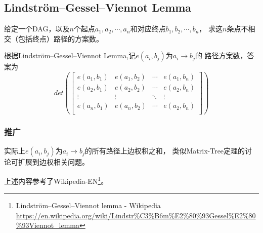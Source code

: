 \subsection{Lindström–Gessel–Viennot Lemma}
给定一个DAG，以及$n$个起点$a_1,a_2,\cdots,a_n$和对应终点$b_1,b_2,\cdots,b_n$，
求这$n$条点不相交（包括终点）路径的方案数。

根据Lindström–Gessel–Viennot Lemma,记$e(a_i,b_j)$为$a_i\rightarrow b_j$的
路径方案数，答案为\begin{displaymath}
	det\left(\left[\begin{array}{cccc}
			e(a_1,b_1) & e(a_1,b_2) & \cdots & e(a_1,b_n) \\
			e(a_2,b_1) & e(a_2,b_2) & \cdots & e(a_2,b_n) \\
			\vdots     & \vdots     & \ddots & \vdots     \\
			e(a_n,b_1) & e(a_n,b_2) & \cdots & e(a_2,b_n) \\
		\end{array}\right]\right)
\end{displaymath}
\subsubsection{推广}
实际上$e(a_i,b_j)$为$a_i\rightarrow b_j$的所有路径上边权积之和，
类似Matrix-Tree定理的讨论可扩展到边权相关问题。

上述内容参考了Wikipedia-EN\footnote{
	Lindström–Gessel–Viennot lemma - Wikipedia
	\url{https://en.wikipedia.org/wiki/Lindstr\%C3\%B6m\%E2\%80\%93Gessel\%E2\%80\%93Viennot\_lemma}
}。
